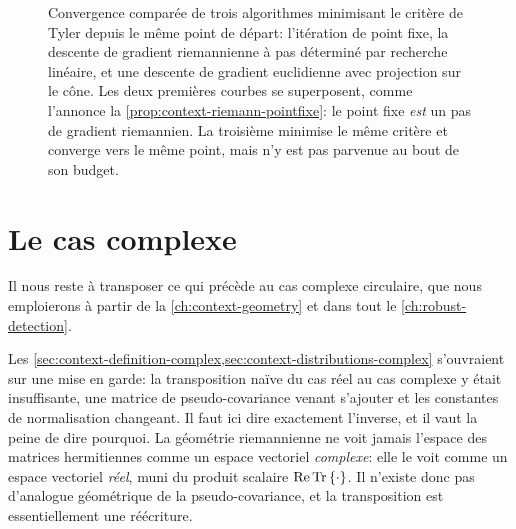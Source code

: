 \begin{figure}[h]
  \begin{center}
    
  \end{center}
  \provConvergenceQR[.5cm]
  \caption{Convergence comparée de trois algorithmes minimisant le critère de
    Tyler depuis le même point de départ: l'itération de point fixe, la
    descente de gradient riemannienne à pas déterminé par recherche linéaire,
    et une descente de gradient euclidienne avec projection sur le cône. Les
    deux premières courbes se superposent, comme l'annonce la
    \cref{prop:context-riemann-pointfixe}: le point fixe \emph{est} un pas de
    gradient riemannien. La troisième minimise le même critère et converge vers
    le même point, mais n'y est pas parvenue au bout de son budget.
    \provConvergence}
  \label{fig:context-riemann-convergence}
\end{figure}


\section{Le cas complexe}
\label{sec:context-riemann-complexe}

Il nous reste à transposer ce qui précède au cas complexe circulaire, que nous emploierons à partir de la \cref{ch:context-geometry} et dans tout le \cref{ch:robust-detection}.

Les \cref{sec:context-definition-complex,sec:context-distributions-complex} s'ouvraient sur une mise en garde: la transposition naïve du cas réel au cas complexe y était insuffisante, une matrice de pseudo-covariance venant s'ajouter et les constantes de normalisation changeant. Il faut ici dire exactement l'inverse, et il vaut la peine de dire pourquoi. La géométrie riemannienne ne voit jamais l'espace des matrices hermitiennes comme un espace vectoriel \emph{complexe}: elle le voit comme un espace vectoriel \emph{réel}, muni du produit scalaire $\operatorname{\operatorname{Re}}\operatorname{\operatorname{Tr}}\left\{\cdot\right\}$. Il n'existe donc pas d'analogue géométrique de la pseudo-covariance, et la transposition est essentiellement une réécriture.

